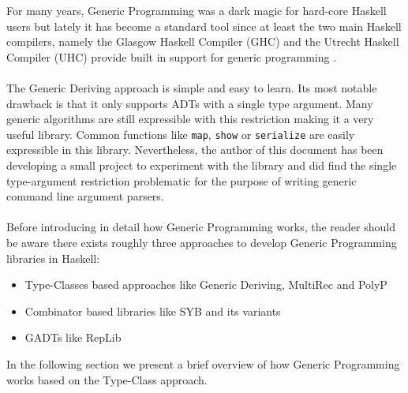 \documentclass[8pt]{extarticle}
\begin{document}
For many years, Generic Programming was a dark magic for hard-core Haskell users but lately it has become a standard tool since at least the two main Haskell compilers, namely the Glasgow Haskell Compiler (GHC) and the Utrecht Haskell Compiler (UHC) provide built in support for generic programming \cite{SYB,GenericDeriving}. 
\\\\
The Generic Deriving approach \cite{GenericDeriving} is simple and easy to learn. Its most notable drawback is that it only supports ADTs with a single type argument. Many generic algorithms are still expressible with this restriction making it a very useful library. Common functions like \verb+map+, \verb+show+ or \verb+serialize+ are easily expressible in this library. Nevertheless, the author of this document has been developing a small project to experiment with the library \cite{Kwargs} and did find the single type-argument restriction problematic for the purpose of writing generic command line argument parsers.
\\\\
Before introducing in detail how Generic Programming works, the reader should be aware there exists roughly three approaches to develop Generic Programming libraries in Haskell:
\begin{itemize}
\item Type-Classes based approaches like Generic Deriving\cite{GenericDeriving}, MultiRec \cite{MultiRec} and PolyP\cite{PolyLib}
\item Combinator based libraries like SYB\cite{SYB} and its variants
\item GADTs like RepLib\cite{RepLib}
\end{itemize}
In the following section we present a brief overview of how Generic Programming works based on the Type-Class approach.
\end{document}
